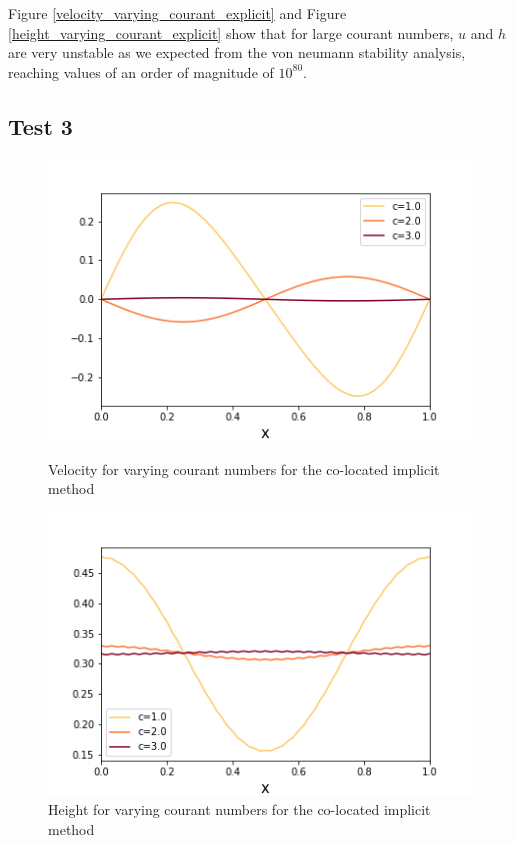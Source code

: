 \documentclass[a4paper,12pt, notitlepage]{article}
\begin{document}
Figure \ref{velocity_varying_courant_explicit} and Figure \ref{height_varying_courant_explicit} show that for large courant numbers, $u$ and $h$ are very unstable as we expected from the von neumann stability analysis, reaching values of an order of magnitude of $10^{80}$.

\subsection{Test 3}

\begin{figure} [H]
	\begin{minipage}{.5\textwidth}
		\ContinuedFloat*
		\captionsetup{width=0.9\textwidth}
		\captionsetup{justification=centering}
		\includegraphics[width=\textwidth]{velocity_varying_courant_implicit.png}
		\caption{\label{velocity_varying_courant_implicit} Velocity for varying courant numbers for the co-located implicit method} 
	\end{minipage}
	\begin{minipage}{.5\textwidth}
		\ContinuedFloat
		\captionsetup{width=0.9\textwidth}
		\captionsetup{justification=centering}
		\includegraphics[width=\textwidth]{height_varying_courant_implicit.png}
		\caption{\label{height_varying_courant_implicit} Height for varying courant numbers for the co-located implicit method} 
	\end{minipage}
\end{figure}
\end{document}
